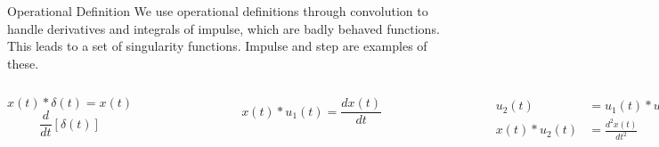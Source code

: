 \begin{frame}{Operational Definition}
    We use operational definitions through convolution to handle derivatives and integrals of impulse, which are badly behaved functions. This leads to a set of singularity functions. Impulse and step are examples of these.

    {
        \begin{columns}
                \begin{equation*}
                    x(t)\ast \delta(t) = x(t)
                \end{equation*}
                \begin{equation*}
                    \frac{d}{dt}\left[\delta(t)\right]
                \end{equation*}
                \begin{figure}
                    \centering
                    
                \end{figure}
                \begin{equation*}
                    x(t)\ast u_1(t) = \frac{dx(t)}{dt}
                \end{equation*}
                \begin{figure}
                    \centering
                    
                \end{figure}
                \begin{align*}
                    u_2(t) &= u_1(t) \ast u_1(t)\\
                    x(t)\ast u_2(t) &= \frac{d^2x(t)}{dt^2}
                \end{align*}

                \begin{align*}
                    u_k(t) &= u_1(t) \ast u_1(t) \ast \cdots k ~\text{times} \\
                    x(t)\ast u_k(t) &= \frac{d^kx(t)}{dt^k}\\
                    u_0(t) &= \delta(t)
                \end{align*}
        \end{columns}
    }
\end{frame}

